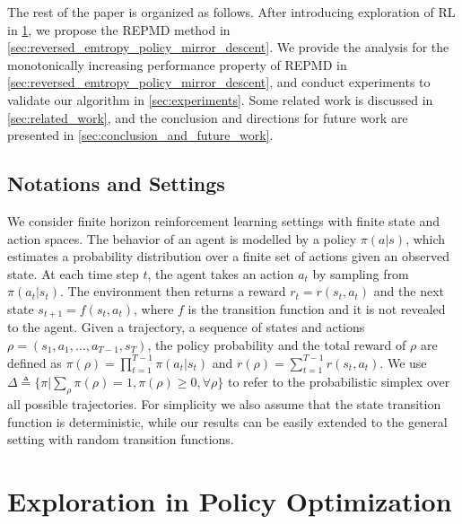 \documentclass{article} %
\begin{document}
The rest of the paper is organized as follows. After introducing exploration of RL in \cref{sec:exploration_in_policy_optimization}, we propose the REPMD method in \cref{sec:reversed_emtropy_policy_mirror_descent}. We provide the analysis for the monotonically increasing performance property of REPMD in \cref{sec:reversed_emtropy_policy_mirror_descent}, and conduct experiments to validate our algorithm in \cref{sec:experiments}. Some related work is discussed in \cref{sec:related_work}, and the conclusion and directions for future work are presented in \cref{sec:conclusion_and_future_work}.

\subsection{Notations and Settings}
\label{sec:notations_and_settings}

We consider finite horizon reinforcement learning settings with finite state and action spaces. The behavior of an agent is modelled by a policy $\pi(a|s)$, which estimates a probability distribution over a finite set of actions given an observed state. At each time step $t$, the agent takes an action $a_t$ by sampling from $\pi(a_t | s_t)$. The environment then returns a reward $r_t = r(s_t, a_t)$ and the next state $s_{t+1} = f(s_t, a_t)$, where $f$ is the transition function and it is not revealed to the agent. Given a trajectory, a sequence of states and actions $\rho=(s_1, a_1, \dots, a_{T-1}, s_T)$, the policy probability and the total reward of $\rho$ are defined as $\pi(\rho) = \prod_{t=1}^{T-1} \pi(a_t| s_t)$ and $r(\rho) = \sum_{t=1}^{T-1} r(s_t, a_t)$. We use $\Delta \triangleq \{ \pi | \sum_{\rho}{\pi(\rho)} = 1, \pi(\rho) \ge 0, \forall \rho \}$ to refer to the probabilistic simplex over all possible trajectories. For simplicity we also assume that the state transition function is deterministic, while our results can be easily extended to the general setting with random transition functions.

\section{Exploration in Policy Optimization}
\label{sec:exploration_in_policy_optimization}
\end{document}
